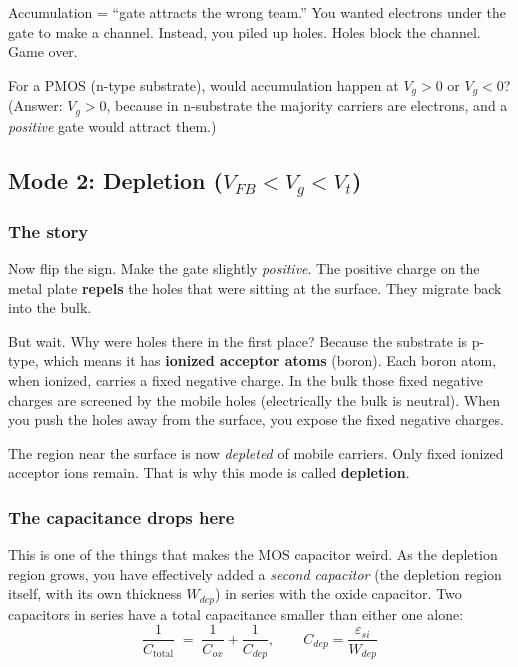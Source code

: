 \documentclass[11pt]{article}
\begin{document}
\begin{hook}
Accumulation = ``gate attracts the wrong team.'' You wanted electrons under the gate to make a channel. Instead, you piled up holes. Holes block the channel. Game over.
\end{hook}

\begin{gut}
For a PMOS (n-type substrate), would accumulation happen at $V_g > 0$ or $V_g < 0$? (Answer: $V_g > 0$, because in n-substrate the majority carriers are electrons, and a \emph{positive} gate would attract them.)
\end{gut}

\subsection{Mode 2: Depletion ($V_{FB} < V_g < V_t$)}

\subsubsection{The story}

Now flip the sign. Make the gate slightly \emph{positive}. The positive charge on the metal plate \textbf{repels} the holes that were sitting at the surface. They migrate back into the bulk.

But wait. Why were holes there in the first place? Because the substrate is p-type, which means it has \textbf{ionized acceptor atoms} (boron). Each boron atom, when ionized, carries a fixed negative charge. In the bulk those fixed negative charges are screened by the mobile holes (electrically the bulk is neutral). When you push the holes away from the surface, you expose the fixed negative charges.

The region near the surface is now \emph{depleted} of mobile carriers. Only fixed ionized acceptor ions remain. That is why this mode is called \textbf{depletion}.

\subsubsection{The capacitance drops here}

This is one of the things that makes the MOS capacitor weird. As the depletion region grows, you have effectively added a \emph{second capacitor} (the depletion region itself, with its own thickness $W_{dep}$) in series with the oxide capacitor. Two capacitors in series have a total capacitance smaller than either one alone:
\begin{equation}
\frac{1}{C_{\text{total}}} \;=\; \frac{1}{C_{ox}} + \frac{1}{C_{dep}}, \qquad C_{dep} = \frac{\varepsilon_{si}}{W_{dep}}
\end{equation}
\end{document}
